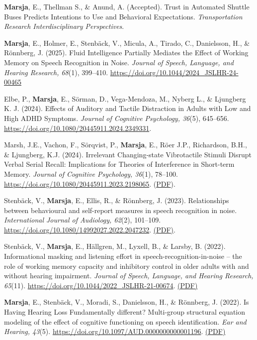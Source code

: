 \documentclass[]{article}
\begin{document}
\textbf{Marsja}, E., Thellman S., \& Anund, A. (Accepted). Trust in
Automated Shuttle Buses Predicts Intentions to Use and Behavioral
Expectations. \emph{Transportation Research Interdisciplinary
Perspectives}.

\textbf{Marsja}, E., Holmer, E., Stenbäck, V., Micula, A., Tirado, C.,
Danielsson, H., \& Rönnberg, J. (2025). Fluid Intelligence Partially
Mediates the Effect of Working Memory on Speech Recognition in Noise.
\emph{Journal of Speech, Language, and Hearing Research, 68}(1),
399--410. \url{https://doi.org/10.1044/2024_JSLHR-24-00465}

Elbe, P., \textbf{Marsja}, E., Sörman, D., Vega-Mendoza, M., Nyberg L.,
\& Ljungberg K. J. (2024). Effects of Auditory and Tactile Distraction
in Adults with Low and High ADHD Symptoms. \emph{Journal of Cognitive
Psychology, 36}(5), 645--656.
\url{https://doi.org/10.1080/20445911.2024.2349331}.

Marsh, J.E., Vachon, F., Sörqvist, P., \textbf{Marsja}, E., Röer J.P.,
Richardson, B.H., \& Ljungberg, K.J. (2024). Irrelevant Changing-state
Vibrotactile Stimuli Disrupt Verbal Serial Recall: Implications for
Theories of Interference in Short-term Memory. \emph{Journal of
Cognitive Psychology, 36}(1), 78--100.
\url{https://doi.org/10.1080/20445911.2023.2198065}.
(\href{https://bit.ly/JoCP23}{PDF}).

Stenbäck, V., \textbf{Marsja}, E., Ellis, R., \& Rönnberg, J. (2023).
Relationships between behavioural and self-report measures in speech
recognition in noise. \emph{International Journal of Audiology, 62}(2),
101--109. \url{https://doi.org/10.1080/14992027.2022.2047232}.
\href{https://bit.ly/IJA2022}{(PDF)}.

Stenbäck, V., \textbf{Marsja}, E., Hällgren, M., Lyxell, B., \& Larsby,
B. (2022). Informational masking and listening effort in
speech-recognition-in-noise -- the role of working memory capacity and
inhibitory control in older adults with and without hearing impairment.
\emph{Journal of Speech, Language, and Hearing Research, 65}(11).
\url{https://doi.org/10.1044/2022_JSLHR-21-00674}.
\href{https://bit.ly/JSLHR22b}{(PDF)}

\textbf{Marsja}, E., Stenbäck, V., Moradi, S., Danielsson, H., \&
Rönnberg, J. (2022). Is Having Hearing Loss Fundamentally different?
Multi-group structural equation modeling of the effect of cognitive
functioning on speech identification. \emph{Ear and Hearing, 43}(5).
\url{https://doi.org/10.1097/AUD.0000000000001196}.
\href{https://bit.ly/EANDH22}{(PDF)}
\end{document}

